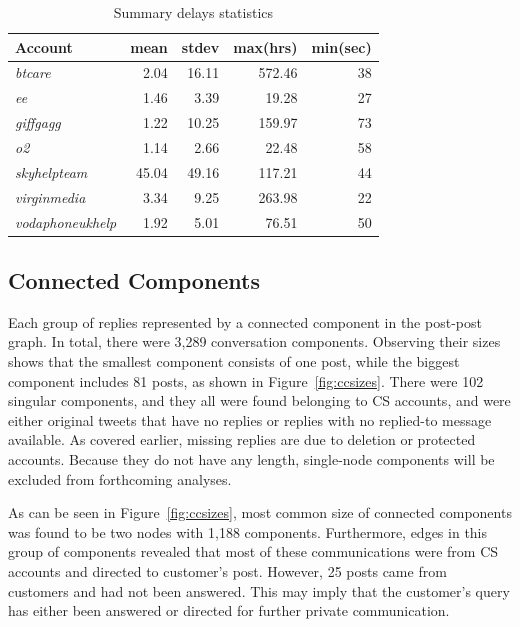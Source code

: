\documentclass[sigconf]{acmart}
\begin{document}
\begin{table}[!h]
\centering
\begin{tabularx}{\columnwidth}{lrrrr}
\toprule
\textbf{Account} & \textbf{mean} & \textbf{stdev} & \textbf{max(hrs)} & \textbf{min(sec)} \\ 
\midrule
{\emph{btcare}} & 2.04 & 16.11 & 572.46 & 38\\
{\emph{ee}} & 1.46 & 3.39 & 19.28 & 27\\
{\emph{giffgagg}} & 1.22 & 10.25 & 159.97 & 73\\ 
{\emph{o2}} & 1.14 & 2.66 & 22.48 & 58\\
{\emph{skyhelpteam}} & 45.04 & 49.16 & 117.21 & 44\\
{\emph{virginmedia}} & 3.34 & 9.25 & 263.98 & 22\\
{\emph{vodaphoneukhelp}} & 1.92 & 5.01 & 76.51 & 50\\
\bottomrule
\end{tabularx}
\caption{Summary delays statistics}
\label{tbl:delaystats}
\end{table}

\subsection{Connected Components}

Each group of replies represented by a connected component in the
post-post graph. In total, there were 3,289 conversation
components. Observing their sizes shows that the smallest component
consists of one post, while the biggest component includes 81 posts,
as shown in Figure~\ref{fig:ccsizes}. There were 102 singular
components, and they all were found belonging to CS accounts, and were
either original tweets that have no replies or replies with no
replied-to message available. As covered earlier, missing replies are
due to deletion or protected accounts. Because they do not have any
length, single-node components will be excluded from forthcoming
analyses.

As can be seen in Figure~\ref{fig:ccsizes}, most common size of
connected components was found to be two nodes with 1,188
components. Furthermore, edges in this group of components revealed
that most of these communications were from CS accounts and directed
to customer's post. However, 25 posts came from customers and had not
been answered. This may imply that the customer's query has either
been answered or directed for further private communication.
\end{document}
